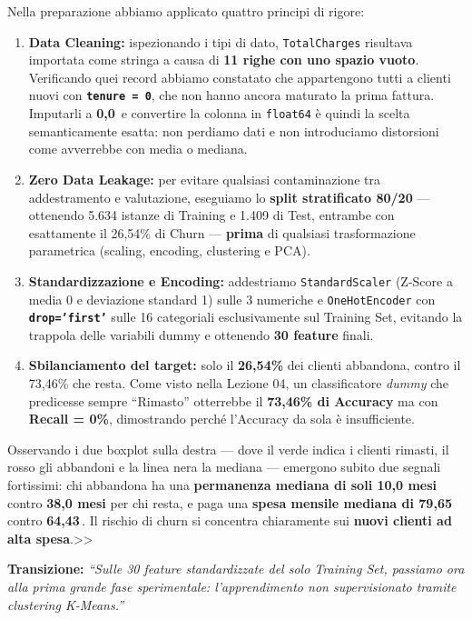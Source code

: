 \documentclass[10pt, a4paper]{article}
\newcommand{\transition}[1]{%
  \par\vspace{2pt}\noindent\colorbox{LightBg}{\parbox{\dimexpr\linewidth-2\fboxsep}{\small\textbf{\color{SecondaryBlue}Transizione:} \textit{``#1''}}}\par\vspace{4pt}%
}
\begin{document}
Nella preparazione abbiamo applicato quattro principi di rigore:
\begin{enumerate}
    \item \textbf{Data Cleaning:} ispezionando i tipi di dato, \texttt{TotalCharges} risultava importata come stringa a causa di \textbf{11 righe con uno spazio vuoto}. Verificando quei record abbiamo constatato che appartengono tutti a clienti nuovi con \textbf{\texttt{tenure = 0}}, che non hanno ancora maturato la prima fattura. Imputarli a \textbf{0,0\,\texteuro} e convertire la colonna in \texttt{float64} è quindi la scelta semanticamente esatta: non perdiamo dati e non introduciamo distorsioni come avverrebbe con media o mediana.
    \item \textbf{Zero Data Leakage:} per evitare qualsiasi contaminazione tra addestramento e valutazione, eseguiamo lo \textbf{split stratificato 80/20} --- ottenendo 5.634 istanze di Training e 1.409 di Test, entrambe con esattamente il 26,54\% di Churn --- \textbf{prima} di qualsiasi trasformazione parametrica (scaling, encoding, clustering e PCA).
    \item \textbf{Standardizzazione e Encoding:} addestriamo \texttt{StandardScaler} (Z-Score a media 0 e deviazione standard 1) sulle 3 numeriche e \texttt{OneHotEncoder} con \textbf{\texttt{drop='first'}} sulle 16 categoriali esclusivamente sul Training Set, evitando la trappola delle variabili dummy e ottenendo \textbf{30 feature} finali.
    \item \textbf{Sbilanciamento del target:} solo il \textbf{26,54\%} dei clienti abbandona, contro il 73,46\% che resta. Come visto nella Lezione 04, un classificatore \textit{dummy} che predicesse sempre ``Rimasto'' otterrebbe il \textbf{73,46\% di Accuracy} ma con \textbf{Recall = 0\%}, dimostrando perché l'Accuracy da sola è insufficiente.
\end{enumerate}
Osservando i due boxplot sulla destra --- dove il verde indica i clienti rimasti, il rosso gli abbandoni e la linea nera la mediana --- emergono subito due segnali fortissimi: chi abbandona ha una \textbf{permanenza mediana di soli 10,0 mesi} contro \textbf{38,0 mesi} per chi resta, e paga una \textbf{spesa mensile mediana di 79,65\,\texteuro} contro \textbf{64,43\,\texteuro}. Il rischio di churn si concentra chiaramente sui \textbf{nuovi clienti ad alta spesa}.>>
\transition{Sulle 30 feature standardizzate del solo Training Set, passiamo ora alla prima grande fase sperimentale: l'apprendimento non supervisionato tramite clustering K-Means.}
\end{document}
